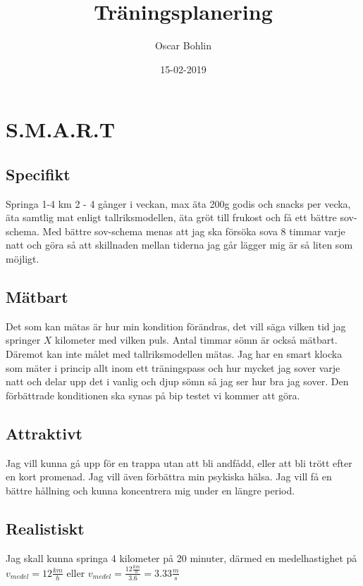 \documentclass{article}
\title{Träningsplanering}
\date{15-02-2019}
\author{Oscar Bohlin}
\begin{document}
\maketitle
\newpage
{}
\tableofcontents
\newpage

\section{S.M.A.R.T}

\subsection{Specifikt}
	
	Springa 1-4 km 2 - 4 gånger i veckan, max äta 200g godis och snacks per vecka, äta samtlig mat enligt tallriksmodellen, äta gröt till frukost och få ett bättre sov-schema. Med bättre sov-schema menas att jag ska försöka sova 8 timmar varje natt och göra så att skillnaden mellan tiderna jag går lägger mig är så liten som möjligt.

\subsection{Mätbart}
	Det som kan mätas är hur min kondition förändras, det vill säga vilken tid jag springer $X$ kilometer med vilken puls. Antal timmar sömn är också mätbart. Däremot kan inte målet med tallriksmodellen mätas. Jag har en smart klocka som mäter i princip allt inom ett träningspass och hur mycket jag sover varje natt och delar upp det i vanlig och djup sömn så jag ser hur bra jag sover. Den förbättrade konditionen ska synas på bip testet vi kommer att göra.

\subsection{Attraktivt}
	Jag vill kunna gå upp för en trappa utan att bli andfådd, eller att bli trött efter en kort promenad. Jag vill även förbättra min psykiska hälsa. Jag vill få en bättre hållning och kunna koncentrera mig under en längre period. 

\subsection{Realistiskt}
	Jag skall kunna springa 4 kilometer på 20 minuter, därmed en medelhastighet på $ v_{medel} = 12 \frac{km}{h}$ eller $ v_{medel} = \frac{12\frac{km}{h}}{3.6} = 3.33 \frac{m}{s}$
\end{document}

